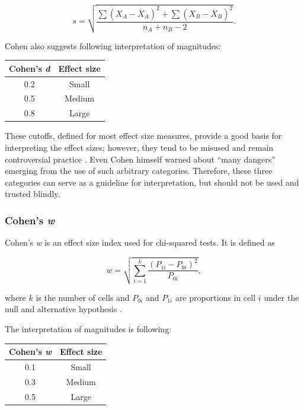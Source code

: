 \begin{equation}
s = \sqrt{\frac{\sum{\left( X_A-\overline{X}_A \right)^2} + \sum{\left( X_B-\overline{X}_B \right)^2}}{n_A+n_B-2}} .
\end{equation}

Cohen \cite{cohen_book} also suggests following interpretation of magnitudes:

\begin{table}[!h] \centering
\begin{tabular}{cc}
\hline
Cohen's \textit{d} & Effect size \\ \hline
0.2                & Small       \\
0.5                & Medium      \\
0.8                & Large       \\ \hline
\end{tabular}
\end{table}

These cutoffs, defined for most effect size measures, provide a good basis for interpreting the effect sizes; however, they tend to be misused and remain controversial practice \cite{effect_sizes}. Even Cohen himself warned about ``many dangers'' emerging from the use of such arbitrary categories. Therefore, these three categories can serve as a guideline for interpretation, but should not be used and trusted blindly.


\subsubsection{Cohen's \textit{w}}

Cohen's \textit{w} is an effect size index used for chi-squared tests. It is defined as

\begin{equation}
w = \sqrt{\sum\limits_{i=1}^k {\frac{\left( P_{1i}-P_{0i} \right)^2}{P_{0i}}}} ,
\end{equation}

where $k$ is the number of cells and $P_{0i}$ and $P_{1i}$ are proportions in cell $i$ under the null and alternative hypothesis \cite{cohen_book}.

The interpretation of magnitudes is following:

\begin{table}[!h] \centering
\begin{tabular}{cc}
\hline
Cohen's \textit{w} & Effect size \\ \hline
0.1                & Small       \\
0.3                & Medium      \\
0.5                & Large       \\ \hline
\end{tabular}
\end{table}

